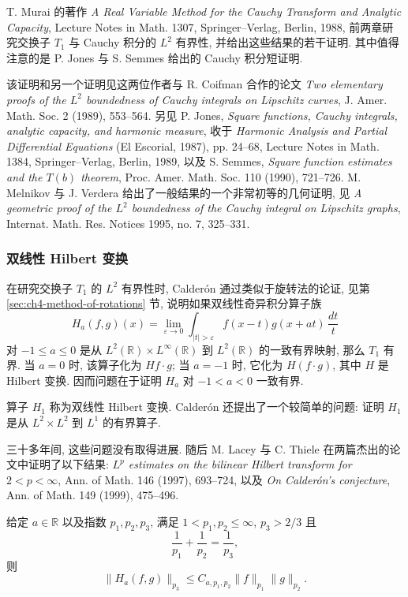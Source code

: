 T. Murai 的著作 \emph{A Real Variable Method for the Cauchy Transform and Analytic Capacity}, Lecture Notes in Math. 1307, Springer--Verlag, Berlin, 1988, 前两章研究交换子 $T_1$ 与 Cauchy 积分的 $L^2$ 有界性, 并给出这些结果的若干证明. 其中值得注意的是 P. Jones 与 S. Semmes 给出的 Cauchy 积分短证明.

\hypertarget{chapter-09-page-226}{}

该证明和另一个证明见这两位作者与 R. Coifman 合作的论文 
\emph{Two elementary proofs of the $L^2$ boundedness of Cauchy integrals on Lipschitz curves}, J. Amer. Math. Soc. 2 (1989), 553--564. 另见 P. Jones, 
\emph{Square functions, Cauchy integrals, analytic capacity, and harmonic measure}, 收于 \emph{Harmonic Analysis and Partial Differential Equations} (El Escorial, 1987), pp. 24--68, Lecture Notes in Math. 1384, Springer--Verlag, Berlin, 1989, 以及 S. Semmes, 
\emph{Square function estimates and the $T(b)$ theorem}, Proc. Amer. Math. Soc. 110 (1990), 721--726. M. Melnikov 与 J. Verdera 给出了一般结果的一个非常初等的几何证明, 见 
\emph{A geometric proof of the $L^2$ boundedness of the Cauchy integral on Lipschitz graphs}, Internat. Math. Res. Notices 1995, no. 7, 325--331.

\subsubsection{双线性 Hilbert 变换}
\label{subsec:ch9-bilinear-hilbert-transform}

在研究交换子 $T_1$ 的 $L^2$ 有界性时, Calderón 通过类似于旋转法的论证, 见第 \ref{sec:ch4-method-of-rotations} 节, 说明如果双线性奇异积分算子族
\[
 H_a(f,g)(x)=\lim_{\varepsilon\to0}
 \int_{|t|>\varepsilon}f(x-t)g(x+at)\,\frac{dt}{t}
\]
对 $-1\leq a\leq0$ 是从 $L^2(\mathbb R)\times L^\infty(\mathbb R)$ 到 $L^2(\mathbb R)$ 的一致有界映射, 那么 $T_1$ 有界. 当 $a=0$ 时, 该算子化为 $Hf\cdot g$; 当 $a=-1$ 时, 它化为 $H(f\cdot g)$, 其中 $H$ 是 Hilbert 变换. 因而问题在于证明 $H_a$ 对 $-1<a<0$ 一致有界.

算子 $H_1$ 称为双线性 Hilbert 变换. Calderón 还提出了一个较简单的问题: 证明 $H_1$ 是从 $L^2\times L^2$ 到 $L^1$ 的有界算子.

三十多年间, 这些问题没有取得进展. 随后 M. Lacey 与 C. Thiele 在两篇杰出的论文中证明了以下结果: 
\emph{$L^p$ estimates on the bilinear Hilbert transform for $2<p<\infty$}, Ann. of Math. 146 (1997), 693--724, 以及 
\emph{On Calderón's conjecture}, Ann. of Math. 149 (1999), 475--496.

\begin{Theorem}
\label{thm:ch9-bilinear-hilbert-transform}
给定 $a\in\mathbb R$ 以及指数 $p_1,p_2,p_3$, 满足 $1<p_1,p_2\leq\infty$, $p_3>2/3$ 且
\[
 \frac1{p_1}+\frac1{p_2}=\frac1{p_3},
\]
则
\[
 \|H_a(f,g)\|_{p_3}\leq C_{a,p_1,p_2}\|f\|_{p_1}\|g\|_{p_2}.
\]
\end{Theorem}


